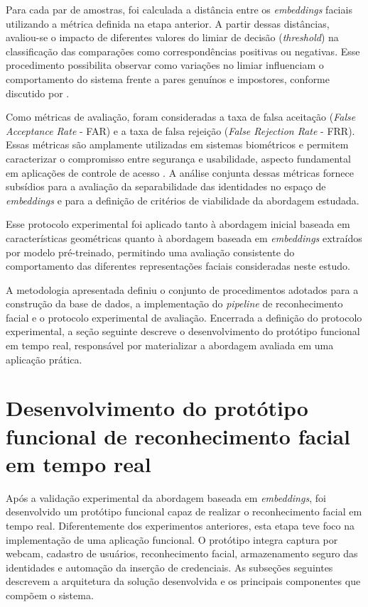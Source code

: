 Para cada par de amostras, foi calculada a distância entre os \textit{embeddings} faciais utilizando a métrica definida na etapa anterior. A partir dessas distâncias, avaliou-se o impacto de diferentes valores do limiar de decisão (\textit{threshold}) na classificação das comparações como correspondências positivas ou negativas. Esse procedimento possibilita observar como variações no limiar influenciam o comportamento do sistema frente a pares genuínos e impostores, conforme discutido por \textcite{jain2004biometric}.

Como métricas de avaliação, foram consideradas a taxa de falsa aceitação (\textit{False Acceptance Rate} - \acs{FAR}) e a taxa de falsa rejeição (\textit{False Rejection Rate} - \acs{FRR}). Essas métricas são amplamente utilizadas em sistemas biométricos e permitem caracterizar o compromisso entre segurança e usabilidade, aspecto fundamental em aplicações de controle de acesso \cite{jain2004biometric}. A análise conjunta dessas métricas fornece subsídios para a avaliação da separabilidade das identidades no espaço de \textit{embeddings} e para a definição de critérios de viabilidade da abordagem estudada.

Esse protocolo experimental foi aplicado tanto à abordagem inicial baseada em características geométricas quanto à abordagem baseada em \textit{embeddings} extraídos por modelo pré-treinado, permitindo uma avaliação consistente do comportamento das diferentes representações faciais consideradas neste estudo.

A metodologia apresentada definiu o conjunto de procedimentos adotados para a construção da base de dados, a implementação do \textit{pipeline} de reconhecimento facial e o protocolo experimental de avaliação. Encerrada a definição do protocolo experimental, a seção seguinte descreve o desenvolvimento do protótipo funcional em tempo real, responsável por materializar a abordagem avaliada em uma aplicação prática.





\section{Desenvolvimento do protótipo funcional de reconhecimento facial em tempo real}

Após a validação experimental da abordagem baseada em \textit{embeddings}, foi desenvolvido um protótipo funcional capaz de realizar o reconhecimento facial em tempo real. Diferentemente dos experimentos anteriores, esta etapa teve foco na implementação de uma aplicação funcional. O protótipo integra captura por webcam, cadastro de usuários, reconhecimento facial, armazenamento seguro das identidades e automação da inserção de credenciais. As subseções seguintes descrevem a arquitetura da solução desenvolvida e os principais componentes que compõem o sistema.

